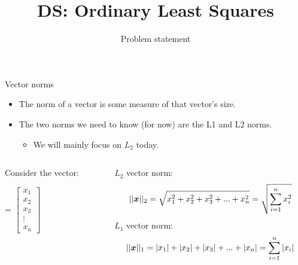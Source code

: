 \documentclass[aspectratio=169]{../latex_main/tntbeamer}  %
\title[Regression]{DS: Ordinary Least Squares}
\subtitle{Problem statement}
\begin{document}
	
	\maketitle
	\begin{frame}{Vector norms}
	    \begin{itemize}
	        \item The norm of a vector is some measure of that vector’s size.
	        \item  The two norms we need to know (for now) are the L1 and L2 norms.
	        \begin{itemize}
	            \item We will mainly focus on $L_2$ today.
	        \end{itemize}
	    \end{itemize}
	    \begin{columns}
	        \begin{column}{.4\textwidth}
	        Consider the vector:

	                 = $\left[\begin{array}{c}
	          x_1\\
	          x_2 \\
	          x_3 \\
	          \vdots\\
	          x_n
	    \end{array}\right]$
	        \end{column}
	        
	        
	        
	         \begin{column}{.5\textwidth}
	                $L_2$ vector norm:
	                \begin{equation*}
	                    ||\bm{x}||_2 = \sqrt{x_1^2 + x_2^2 + x_3^2 + ... + x_n^2} = \sqrt{\sum\limits_{i=1}^nx_i^2}
	                \end{equation*}
	                $L_1$ vector norm:
	                \begin{equation*}
	                    ||\bm{x}||_1 = |x_1| + |x_2| + |x_3| + ... +|x_n| = \sum\limits_{i=1}^n|x_i| 
	                \end{equation*}
	        \end{column}
	    \end{columns}
	\end{frame}
	
\end{document}
